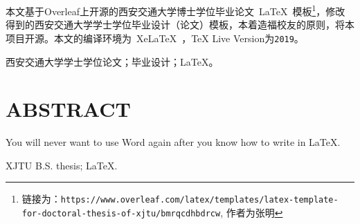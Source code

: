 
\clearpage
\titlespacing{\chapter}{0pt}{0mm}{5mm}



本文基于Overleaf上开源的西安交通大学博士学位毕业论文~\LaTeX~模板\footnote{链接为：\texttt{https://www.overleaf.com/latex/templates/latex-template-for-doctoral-thesis-of-xjtu/bmrqcdhbdrcw}, 作者为张明}，修改得到的西安交通大学学士学位毕业设计（论文）模板，本着造福校友的原则，将本项目开源。{\color{red}本文的编译环境为~XeLaTeX~，TeX Live Version为\texttt{2019}}。

\vspace{\baselineskip}
 西安交通大学学士学位论文；毕业设计；\LaTeX。


\clearpage
{}

\titlespacing{\chapter}{0pt}{0mm}{5mm}
\chapter*{ABSTRACT}

\noindent You will never want to use Word again after you know how to write in \LaTeX.

\vspace{\baselineskip}
 XJTU B.S. thesis; \LaTeX.


\titlespacing{\chapter}{0pt}{-6mm}{5mm}
\clearpage{\pagestyle{empty}\cleardoublepage}
